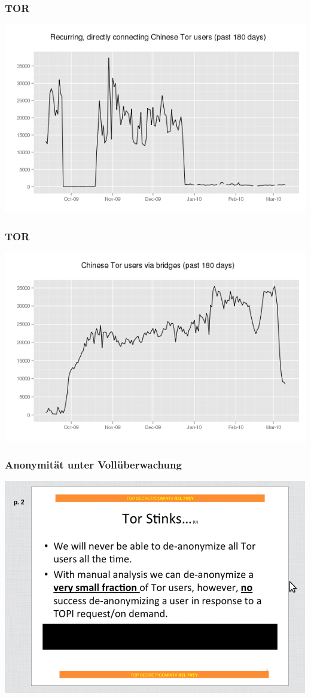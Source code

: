 \documentclass[12pt]{beamer}
\begin{document}
\begin{frame}
    \frametitle{TOR}
    \includegraphics[height=0.7\textheight]{img/bridge1.png}
\end{frame}

\begin{frame}
    \frametitle{TOR}
    \includegraphics[height=0.7\textheight]{img/bridge2.png}
\end{frame}

\begin{frame}
    \frametitle{Anonymität unter Vollüberwachung}
    \includegraphics[height=0.7\textheight]{img/torstinks.png}
\end{frame}
\end{document}
